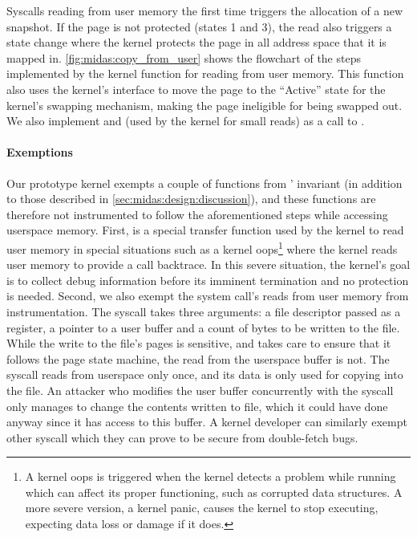 Syscalls reading from user memory the first time triggers the
allocation of a new snapshot.
If the page is not protected (states 1 and 3), the read also
triggers a state change where the kernel protects the page
in all address space that it is mapped in.
\autoref{fig:midas:copy_from_user} shows the flowchart of the steps
implemented by the kernel function  for
reading from user memory.
This function also uses the kernel's 
interface to move the page to the ``Active'' state for the
kernel's swapping mechanism, making the page ineligible for being
swapped out.
We also implement  and 
(used by the kernel for small reads) as a call to .

\paragraph{Exemptions}
Our prototype \midas kernel exempts a couple of functions
from \midas' invariant (in addition to those described in
\autoref{sec:midas:design:discussion}), and these functions are
therefore not instrumented
to follow the aforementioned steps while accessing userspace
memory.
First,  is a special
transfer function used by the kernel to
read user memory in special situations such as a kernel
oops\footnote{A kernel oops is triggered when the kernel detects a
problem while running which can affect its proper functioning, such
as corrupted data structures.
A more severe version, a kernel panic, causes the kernel to stop
executing, expecting data loss or damage if it does.}
where the kernel reads user memory to provide a call backtrace.
In this severe situation, the kernel's goal is to collect debug
information before its imminent termination and no \tocttou protection
is needed.
Second, we also exempt the  system
call's reads from user memory from instrumentation.
The  syscall takes three arguments: a
file descriptor passed as a register, a pointer to a user
buffer and a count of bytes to be written to the file.
While the write to the file's pages is sensitive, and
\midas takes care to ensure that it follows the page state
machine, the read from the userspace buffer is not.
The syscall reads from userspace only once, and its data
is only used for copying into the file.
An attacker who modifies the user buffer concurrently with
the syscall only manages to change the contents written to
file, which it could have done anyway since it has access to
this buffer.
A kernel developer can similarly exempt other syscall which
they can prove to be secure from double-fetch bugs.


